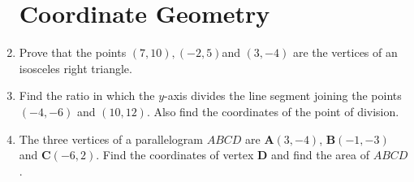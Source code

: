 \documentclass[10pt,-letter paper]{article}
\let\vec\mathbf{}
\let\vec\mathbf{}
\let\vec\mathbf{}
\begin{document}
\begin{enumerate}
\section{Coordinate Geometry}
\item Prove that the points $(7, 10), (-2, 5) $and $(3, -4)$ are the vertices of an isosceles right triangle.
\item Find the ratio in which the $y$-axis divides the line segment joining the points $(-4,-6)$ and $(10,12)$. Also find the coordinates of the point of division.


\item The three vertices of a parallelogram $ABCD$ are $\vec{A}(3, -4)$, $\vec{B}(-1, -3)$ and $\vec{C}(-6, 2)$. Find the coordinates of vertex $\vec{D}$ and find the area of $ABCD$.
\setcounter{figure}{1}
\end{enumerate}
\end{document}
